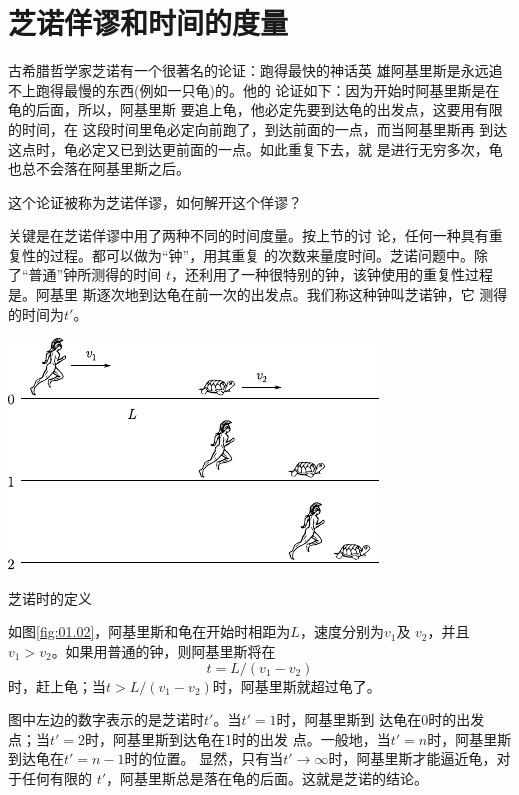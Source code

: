 \section{芝诺佯谬和时间的度量}\label{sec:01.02}

古希腊哲学家芝诺有一个很著名的论证：跑得最快的神话英
雄阿基里斯是永远追不上跑得最慢的东西(例如一只龟)的。他的
论证如下：因为开始时阿基里斯是在龟的后面，所以，阿基里斯
要追上龟，他必定先要到达龟的出发点，这要用有限的时间，在
这段时间里龟必定向前跑了，到达前面的一点，而当阿基里斯再
到达这点时，龟必定又已到达更前面的一点。如此重复下去，就
是进行无穷多次，龟也总不会落在阿基里斯之后。

这个论证被称为芝诺佯谬，如何解开这个佯谬？

关键是在芝诺佯谬中用了两种不同的时间度量。按上节的讨
论，任何一种具有重复性的过程。都可以做为“钟”，用其重复
的次数来量度时间。芝诺问题中。除了“普通”钟所测得的时间
$t$，还利用了一种很特别的钟，该钟使用的重复性过程是。阿基里
斯逐次地到达龟在前一次的出发点。我们称这种钟叫芝诺钟，它
测得的时间为$t'$。

\begin{figurex}[!h]
    \centering
    \includegraphics{figure/fig01.02}
    \caption{芝诺时的定义}
    \label{fig:01.02}
\end{figurex}
如图\ref{fig:01.02}，阿基里斯和龟在开始时相距为$L$，速度分别为$v_1$及
$v_2$，并且$v_1>v_2$。如果用普通的钟，则阿基里斯将在
\begin{equation}
    t=L/(v_1-v_2)
    \label{eqn:01.02.01}
\end{equation}
时，赶上龟；当$t>L/(v_1-v_2)$时，阿基里斯就超过龟了。

图中左边的数字表示的是芝诺时$t'$。当$t'=1$时，阿基里斯到
达龟在0时的出发点；当$t'=2$时，阿基里斯到达龟在1时的出发
点。一般地，当$t'=n$时，阿基里斯到达龟在$t'=n-1$时的位置。
显然，只有当$t'\rightarrow\infty$时，阿基里斯才能逼近龟，对于任何有限的
$t'$，阿基里斯总是落在龟的后面。这就是芝诺的结论。

